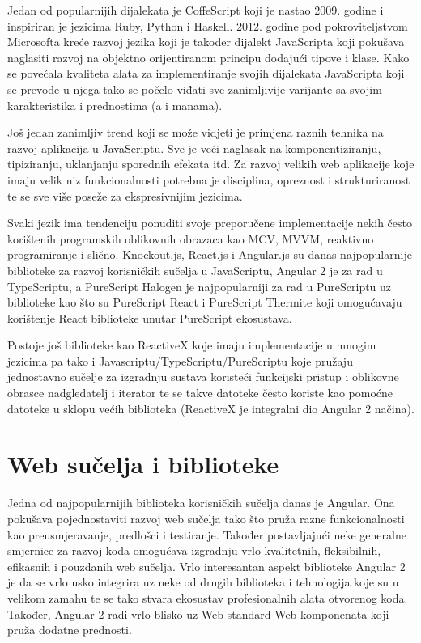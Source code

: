 \documentclass[times, utf8, zavrsni]{fer}
\begin{document}
Jedan od popularnijih dijalekata je CoffeScript koji je nastao 2009. godine i inspiriran je jezicima Ruby, Python i Haskell. 2012. godine pod pokroviteljstvom Microsofta kreće razvoj jezika  koji je također dijalekt JavaScripta koji pokušava naglasiti razvoj na objektno orijentiranom principu dodajući tipove i klase. Kako se povećala kvaliteta alata za implementiranje svojih dijalekata JavaScripta koji se prevode u njega tako se počelo viđati sve zanimljivije varijante sa svojim karakteristika i prednostima (a i manama).

Još jedan zanimljiv trend koji se može vidjeti je primjena raznih tehnika na razvoj aplikacija u JavaScriptu. Sve je veći naglasak na komponentiziranju, tipiziranju, uklanjanju sporednih efekata itd. Za razvoj velikih web aplikacije koje imaju velik niz funkcionalnosti potrebna je disciplina, opreznost i strukturiranost te se sve više poseže za ekspresivnijim jezicima.

Svaki jezik ima tendenciju ponuditi svoje preporučene implementacije nekih često korištenih programskih oblikovnih obrazaca kao MCV, MVVM, reaktivno programiranje i slično. Knockout.js, React.js i Angular.js su danas najpopularnije biblioteke za razvoj korisničkih sučelja u JavaScriptu, Angular 2 je za rad u TypeScriptu, a PureScript Halogen je najpopularniji za rad u PureScriptu uz biblioteke kao što su PureScript React i PureScript Thermite koji omogućavaju korištenje React biblioteke unutar PureScript ekosustava.

Postoje još biblioteke kao ReactiveX koje imaju implementacije u mnogim jezicima pa tako i Javascriptu/TypeScriptu/PureScriptu koje pružaju jednostavno sučelje za izgradnju sustava koristeći funkcijski pristup i oblikovne obrasce nadgledatelj i iterator te se takve datoteke često koriste kao pomoćne datoteke u sklopu većih biblioteka (ReactiveX je integralni dio Angular 2 načina).

\section{Web sučelja i biblioteke}
Jedna od najpopularnijih biblioteka korisničkih sučelja danas je Angular. Ona pokušava pojednostaviti razvoj web sučelja tako što pruža razne funkcionalnosti kao preusmjeravanje, predlošci i testiranje. Također postavljajući neke generalne smjernice za razvoj koda omogućava izgradnju vrlo kvalitetnih, fleksibilnih, efikasnih i pouzdanih web sučelja. Vrlo interesantan aspekt biblioteke Angular 2 je da se vrlo usko integrira uz neke od drugih biblioteka i tehnologija koje su u velikom zamahu te se tako stvara ekosustav profesionalnih alata otvorenog koda. Također, Angular 2 radi vrlo blisko uz Web standard Web komponenata koji pruža dodatne prednosti.
\end{document}
